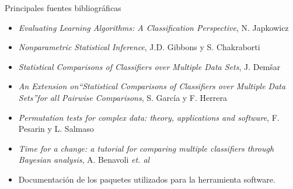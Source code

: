 \documentclass[leqno]{beamer}
\theoremstyle{definition_wo_parentheses}
\begin{document}
\begin{frame}{Principales fuentes bibliográficas}
\begin{itemize}
\item \textit{Evaluating Learning Algorithms: A Classification Perspective}, N. Japkowicz
\item \textit{Nonparametric Statistical Inference}, J.D. Gibbons y S. Chakraborti
\item \textit{Statistical Comparisons of Classifiers over Multiple Data Sets}, J. Dem\v{s}ar
\item \textit{An Extension on``Statistical Comparisons of Classifiers over Multiple Data Sets''for all Pairwise Comparisons}, S. García y F. Herrera
\item \textit{Permutation tests for complex data: theory, applications and software}, F. Pesarin y L. Salmaso
\item \textit{ Time for a change: a tutorial for comparing multiple classifiers through Bayesian analysis}, A. Benavoli \textit{et. al}
\item Documentación de los paquetes utilizados para la herramienta software.
\end{itemize}
\end{frame}
\end{document}
